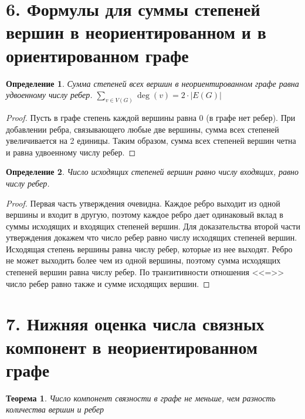 \documentclass[a4paper,12pt]{article}
\newtheorem{ther}{Теорема}
\newtheorem*{defin}{Определение}
\begin{document}
    \section*{6. Формулы для суммы степеней вершин в неориентированном и в ориентированном графе}

    \begin{defin}
        Сумма степеней всех вершин в неориентированном графе равна удвоенному числу ребер. $\displaystyle\sum_{v \in V(G)} \deg(v) = 2 \cdot |E(G)|$
    \end{defin}
    \begin{proof}
        Пусть в графе степень каждой вершины равна $0$ (в графе нет ребер). При добавлении ребра, связывающего любые две вершины, сумма всех степеней увеличивается на 2 единицы. Таким образом, сумма всех степеней вершин четна и равна удвоенному числу ребер.
    \end{proof}
    \begin{defin}
        Число исходящих степеней вершин равно числу входящих, равно числу ребер.
    \end{defin}
    \begin{proof}
        Первая часть утверждения очевидна. Каждое ребро выходит из одной вершины и входит в другую, поэтому каждое ребро дает одинаковый вклад в суммы исходящих и входящих степеней вершин. Для доказательства второй части утверждения докажем что число ребер равно числу исходящих степеней вершин. Исходящая степень вершины равна числу ребер, которые из нее выходят. Ребро не может выходить более чем из одной вершины, поэтому сумма исходящих степеней вершин равна числу ребер. По транзитивности отношения <<=>> число ребер равно также и сумме исходящих вершин.
    \end{proof}


	\section*{7. Нижняя оценка числа связных компонент в неориентированном графе}
	
	\begin{ther}
		Число компонент связности в графе не меньше, чем разность количества вершин и ребер
	\end{ther}
	
\end{document}
